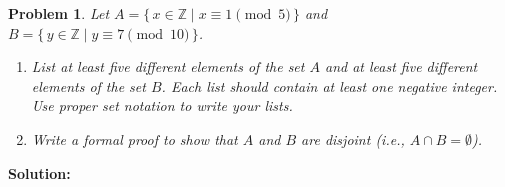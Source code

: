 \documentclass[12pt]{article}
\newtheorem{problem}{Problem}
\theoremstyle{definition}
\begin{document}
\begin{problem}
Let $A = \{\, x \in \mathbb{Z} \mid x \equiv 1 \pmod{5} \,\}$ and $B = \{\, y \in \mathbb{Z} \mid y \equiv 7 \pmod{10} \,\}$.

\begin{enumerate}[label=(\alph*)]
    \item List at least five different elements of the set $A$ and at least five different elements of the set $B$. Each list should contain at least one negative integer. Use proper set notation to write your lists.

    \item Write a formal proof to show that $A$ and $B$ are disjoint (i.e., $A \cap B = \emptyset$).
\end{enumerate}
\end{problem}

\textbf{Solution:}
\end{document}
